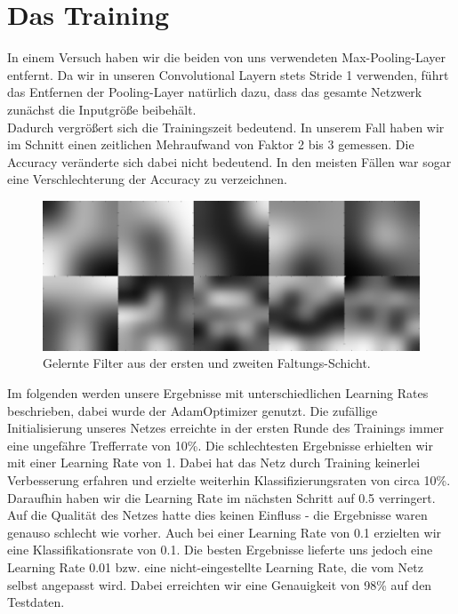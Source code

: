\documentclass[10pt,journal,compsoc]{IEEEtran}
\begin{document}
\section{Das Training}

In einem Versuch haben wir die beiden von uns verwendeten Max-Pooling-Layer entfernt.
Da wir in unseren Convolutional Layern stets Stride 1 verwenden, führt das Entfernen der Pooling-Layer natürlich dazu, dass das gesamte Netzwerk zunächst die Inputgröße beibehält.\\

\noindent Dadurch vergrößert sich die Trainingszeit bedeutend. In unserem Fall haben wir im Schnitt einen zeitlichen Mehraufwand von Faktor 2 bis 3 gemessen.
Die Accuracy veränderte sich dabei nicht bedeutend. In den meisten Fällen war sogar eine Verschlechterung der Accuracy zu verzeichnen.\\

\begin{figure}[!h]
\centering
\includegraphics[scale=0.25]{learned_conv_filter_from_first_and_second_layer}
\caption{Gelernte Filter aus der ersten und zweiten Faltungs-Schicht.}
\end{figure}

\noindent Im folgenden werden unsere Ergebnisse mit unterschiedlichen Learning Rates beschrieben, dabei wurde der AdamOptimizer genutzt.
Die zufällige Initialisierung unseres Netzes erreichte in der ersten Runde des Trainings immer eine ungefähre Trefferrate von 10\%.
Die schlechtesten Ergebnisse erhielten wir mit einer Learning Rate von 1. Dabei hat das Netz durch Training keinerlei Verbesserung erfahren und erzielte weiterhin Klassifizierungsraten von circa 10\%.\\

\noindent Daraufhin haben wir die Learning Rate im nächsten Schritt auf 0.5 verringert. Auf die Qualität des Netzes hatte dies keinen Einfluss - die Ergebnisse waren genauso schlecht wie vorher.
Auch bei einer Learning Rate von 0.1 erzielten wir eine Klassifikationsrate von 0.1.
Die besten Ergebnisse lieferte uns jedoch eine Learning Rate 0.01 bzw. eine nicht-eingestellte Learning Rate, die vom Netz selbst angepasst wird. Dabei erreichten wir eine Genauigkeit von 98\% auf den Testdaten.
\end{document}
